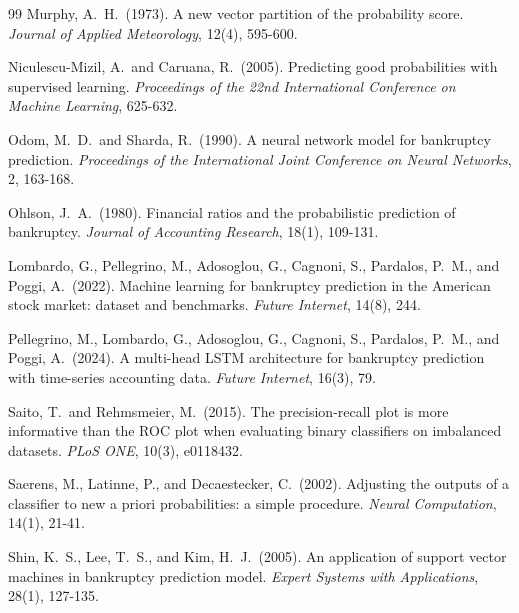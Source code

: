 \documentclass[12pt,a4paper]{article}
\begin{document}
\begin{thebibliography}{99}
Murphy, A.\ H.\ (1973).
\newblock A new vector partition of the probability score.
\newblock \textit{Journal of Applied Meteorology}, 12(4), 595-600.

Niculescu-Mizil, A.\ and Caruana, R.\ (2005).
\newblock Predicting good probabilities with supervised learning.
\newblock \textit{Proceedings of the 22nd International Conference on Machine
Learning}, 625-632.

Odom, M.\ D.\ and Sharda, R.\ (1990).
\newblock A neural network model for bankruptcy prediction.
\newblock \textit{Proceedings of the International Joint Conference on Neural
Networks}, 2, 163-168.

Ohlson, J.\ A.\ (1980).
\newblock Financial ratios and the probabilistic prediction of bankruptcy.
\newblock \textit{Journal of Accounting Research}, 18(1), 109-131.

Lombardo, G., Pellegrino, M., Adosoglou, G., Cagnoni, S., Pardalos, P.\ M.,
and Poggi, A.\ (2022).
\newblock Machine learning for bankruptcy prediction in the American stock
market: dataset and benchmarks.
\newblock \textit{Future Internet}, 14(8), 244.

Pellegrino, M., Lombardo, G., Adosoglou, G., Cagnoni, S., Pardalos, P.\ M.,
and Poggi, A.\ (2024).
\newblock A multi-head LSTM architecture for bankruptcy prediction with
time-series accounting data.
\newblock \textit{Future Internet}, 16(3), 79.

Saito, T.\ and Rehmsmeier, M.\ (2015).
\newblock The precision-recall plot is more informative than the ROC plot
when evaluating binary classifiers on imbalanced datasets.
\newblock \textit{PLoS ONE}, 10(3), e0118432.

Saerens, M., Latinne, P., and Decaestecker, C.\ (2002).
\newblock Adjusting the outputs of a classifier to new a priori probabilities:
a simple procedure.
\newblock \textit{Neural Computation}, 14(1), 21-41.

Shin, K.\ S., Lee, T.\ S., and Kim, H.\ J.\ (2005).
\newblock An application of support vector machines in bankruptcy prediction
model.
\newblock \textit{Expert Systems with Applications}, 28(1), 127-135.


\end{thebibliography}
\end{document}

